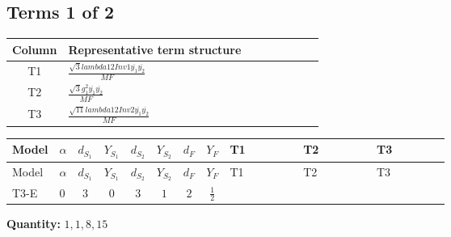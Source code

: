 \documentclass[8pt]{article}
\begin{document}
\begin{landscape}
\subsection*{Terms 1 of 2}
\begin{center}
\begin{tabular}{@{}c >{\raggedright\arraybackslash}p{0.82\linewidth}@{}}
\toprule
Column & Representative term structure \\
\midrule
T1 & \(\displaystyle \frac{\sqrt{3} lambda12Inv1 \overline{y_{1}} \overline{y_{2}}}{MF}\) \\
\midrule
T2 & \(\displaystyle \frac{\sqrt{3} g_{1}^{2} \overline{y_{1}} \overline{y_{2}}}{MF}\) \\
\midrule
T3 & \(\displaystyle \frac{\sqrt{11} lambda12Inv2 \overline{y_{1}} \overline{y_{2}}}{MF}\) \\
\midrule
\bottomrule
\end{tabular}
\end{center}
\smallskip
\tiny
\begin{longtable}{@{}llcccccc >{\raggedright\arraybackslash}p{0.21\linewidth} >{\raggedright\arraybackslash}p{0.21\linewidth} >{\raggedright\arraybackslash}p{0.21\linewidth}@{}}
\toprule
Model & $\alpha$ & $d_{S_1}$ & $Y_{S_1}$ & $d_{S_2}$ & $Y_{S_2}$ & $d_F$ & $Y_F$ & T1 & T2 & T3 \\
\midrule
\endfirsthead
\toprule
Model & $\alpha$ & $d_{S_1}$ & $Y_{S_1}$ & $d_{S_2}$ & $Y_{S_2}$ & $d_F$ & $Y_F$ & T1 & T2 & T3 \\
\midrule
\endhead
T3-E & $0$ & $3$ & $0$ & $3$ & $1$ & $2$ & $\frac{1}{2}$ & \scriptsize\adjustbox{max width=\linewidth}{$\begin{gathered} - \frac{\sqrt{3} lambda12Inv1 \overline{y_{1}} \overline{y_{2}}}{6 MF}\end{gathered}$} & \scriptsize\adjustbox{max width=\linewidth}{$\begin{gathered} \frac{\sqrt{3} g_{1}^{2} \overline{y_{1}} \overline{y_{2}}}{8 MF}\end{gathered}$} & \scriptsize\adjustbox{max width=\linewidth}{$\begin{gathered} \frac{3 \sqrt{11} lambda12Inv2 \overline{y_{1}} \overline{y_{2}}}{22 MF}\end{gathered}$} \\
\midrule
\bottomrule
\end{longtable}
\clearpage
\noindent\textbf{Quantity: }$\mathrm{1,1,8,15}$\par\smallskip

\end{landscape}
\end{document}
